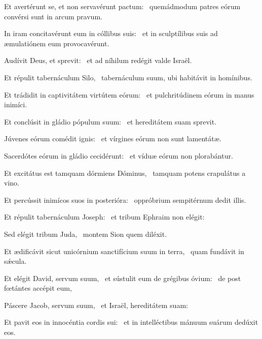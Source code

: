 \item Et avertérunt se, et non servavérunt pactum:~\psstar{} quemádmodum patres eórum convérsi sunt in arcum pravum.

\item In iram concitavérunt eum in cóllibus suis:~\psstar{} et in sculptílibus suis ad æmulatiónem eum provocavérunt.

\item Audívit Deus, et sprevit:~\psstar{} et ad níhilum redégit valde Israël.

\item Et répulit tabernáculum Silo,~\psstar{} tabernáculum suum, ubi habitávit in homínibus.

\item Et trádidit in captivitátem virtútem eórum:~\psstar{} et pulchritúdinem eórum in manus inimíci.

\item Et conclúsit in gládio pópulum suum:~\psstar{} et hereditátem suam sprevit.

\item Júvenes eórum comédit ignis:~\psstar{} et vírgines eórum non sunt lamentátæ.

\item Sacerdótes eórum in gládio cecidérunt:~\psstar{} et víduæ eórum non plorabántur.

\item Et excitátus est tamquam dórmiens Dóminus,~\psstar{} tamquam potens crapulátus a vino.

\item Et percússit inimícos suos in posterióra:~\psstar{} oppróbrium sempitérnum dedit illis.

\item Et répulit tabernáculum Joseph:~\psstar{} et tribum Ephraim non elégit:

\item Sed elégit tribum Juda,~\psstar{} montem Sion quem diléxit.

\item Et ædificávit sicut unicórnium sanctifícium suum in terra,~\psstar{} quam fundávit in sǽcula.

\item Et elégit David, servum suum,~\pscross{} et sústulit eum de grégibus óvium:~\psstar{} de post fœtántes accépit eum,

\item Páscere Jacob, servum suum,~\psstar{} et Israël, hereditátem suam:

\item Et pavit eos in innocéntia cordis sui:~\psstar{} et in intelléctibus mánuum suárum dedúxit eos.
